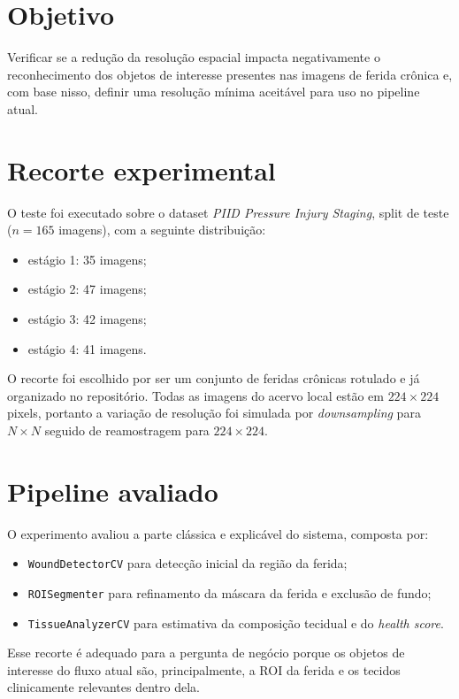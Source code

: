 \documentclass[
    12pt,
    openright,
    oneside,
    a4paper,
    chapter=TITLE,
    section=TITLE,
    brazil,
    sumario=tradicional,
    hidelinks
]{abntex2}
\begin{document}
\tableofcontents*
\cleardoublepage

\textual

\section{Objetivo}
Verificar se a redução da resolução espacial impacta negativamente o reconhecimento dos objetos de interesse presentes nas imagens de ferida crônica e, com base nisso, definir uma resolução mínima aceitável para uso no pipeline atual.

\section{Recorte experimental}
O teste foi executado sobre o dataset \textit{PIID Pressure Injury Staging}, split de teste (\(n = 165\) imagens), com a seguinte distribuição:
\begin{itemize}
    \item estágio 1: 35 imagens;
    \item estágio 2: 47 imagens;
    \item estágio 3: 42 imagens;
    \item estágio 4: 41 imagens.
\end{itemize}

O recorte foi escolhido por ser um conjunto de feridas crônicas rotulado e já organizado no repositório. Todas as imagens do acervo local estão em \(224 \times 224\) pixels, portanto a variação de resolução foi simulada por \textit{downsampling} para \(N \times N\) seguido de reamostragem para \(224 \times 224\).

\section{Pipeline avaliado}
O experimento avaliou a parte clássica e explicável do sistema, composta por:
\begin{itemize}
    \item \texttt{WoundDetectorCV} para detecção inicial da região da ferida;
    \item \texttt{ROISegmenter} para refinamento da máscara da ferida e exclusão de fundo;
    \item \texttt{TissueAnalyzerCV} para estimativa da composição tecidual e do \textit{health score}.
\end{itemize}

Esse recorte é adequado para a pergunta de negócio porque os objetos de interesse do fluxo atual são, principalmente, a ROI da ferida e os tecidos clinicamente relevantes dentro dela.
\end{document}
